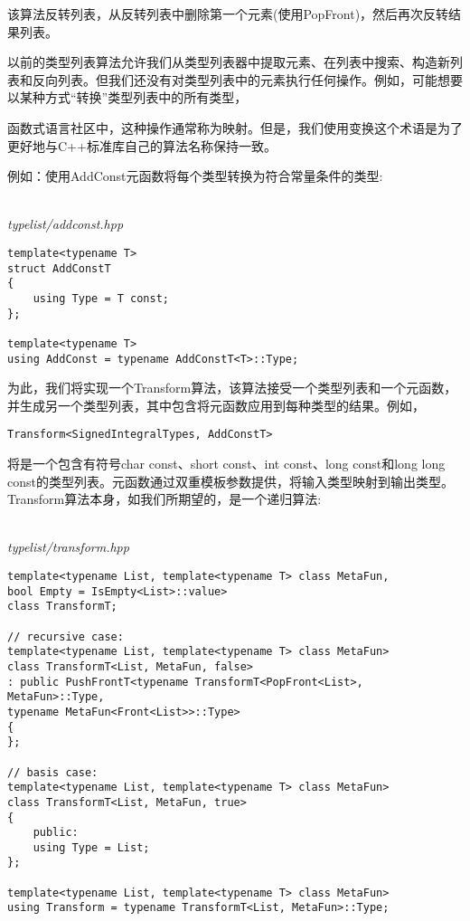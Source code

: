 该算法反转列表，从反转列表中删除第一个元素(使用PopFront)，然后再次反转结果列表。


以前的类型列表算法允许我们从类型列表器中提取元素、在列表中搜索、构造新列表和反向列表。但我们还没有对类型列表中的元素执行任何操作。例如，可能想要以某种方式“转换”类型列表中的所有类型，

\begin{tcolorbox}[colback=webgreen!5!white,colframe=webgreen!75!black]
\hspace*{0.75cm}函数式语言社区中，这种操作通常称为映射。但是，我们使用变换这个术语是为了更好地与C++标准库自己的算法名称保持一致。
\end{tcolorbox}

例如：使用AddConst元函数将每个类型转换为符合常量条件的类型:

\hspace*{\fill} \\ %
\noindent
\textit{typelist/addconst.hpp}
\begin{lstlisting}[style=styleCXX]
template<typename T>
struct AddConstT
{
	using Type = T const;
};

template<typename T>
using AddConst = typename AddConstT<T>::Type;
\end{lstlisting}

为此，我们将实现一个Transform算法，该算法接受一个类型列表和一个元函数，并生成另一个类型列表，其中包含将元函数应用到每种类型的结果。例如，

\begin{lstlisting}[style=styleCXX]
Transform<SignedIntegralTypes, AddConstT>
\end{lstlisting}

将是一个包含有符号char const、short const、int const、long const和long long const的类型列表。元函数通过双重模板参数提供，将输入类型映射到输出类型。Transform算法本身，如我们所期望的，是一个递归算法:

\hspace*{\fill} \\ %
\noindent
\textit{typelist/transform.hpp}
\begin{lstlisting}[style=styleCXX]
template<typename List, template<typename T> class MetaFun,
bool Empty = IsEmpty<List>::value>
class TransformT;

// recursive case:
template<typename List, template<typename T> class MetaFun>
class TransformT<List, MetaFun, false>
: public PushFrontT<typename TransformT<PopFront<List>, MetaFun>::Type,
typename MetaFun<Front<List>>::Type>
{
};

// basis case:
template<typename List, template<typename T> class MetaFun>
class TransformT<List, MetaFun, true>
{
	public:
	using Type = List;
};

template<typename List, template<typename T> class MetaFun>
using Transform = typename TransformT<List, MetaFun>::Type;
\end{lstlisting}

